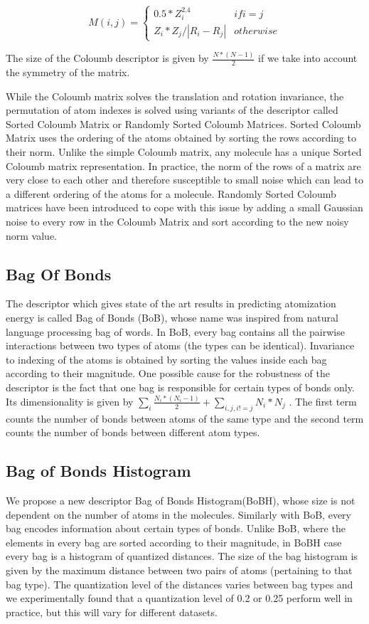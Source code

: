 \documentclass{article}
\begin{document}
\[M(i,j) = \left\{
  \begin{array}{lr}
    0.5*Z_i^{2.4} & if i = j\\
    Z_i * Z_j / |R_i - R_j| & otherwise
  \end{array}
\right.
\]

The size of the Coloumb descriptor is given by $\frac{N*(N - 1)}{2}$ if we take into account the symmetry of the matrix.

While the Coloumb matrix solves the translation and rotation invariance, the permutation of atom indexes is solved using variants of the descriptor called Sorted Coloumb Matrix or Randomly Sorted Coloumb Matrices.  Sorted Coloumb Matrix uses the ordering of the atoms obtained by sorting the rows according to their norm. Unlike the simple Coloumb matrix, any molecule has a unique Sorted Coloumb matrix representation.
In practice,  the norm of the rows of a matrix are very close to each other and therefore susceptible to small noise which can lead to a different ordering of the atoms for a molecule. Randomly Sorted Coloumb matrices have been introduced to cope with this issue by adding a small Gaussian noise to every row in the Coloumb Matrix and sort according to the new noisy norm value.

\subsection{Bag Of Bonds}
The descriptor which gives state of the art results in predicting atomization energy is called Bag of Bonds (BoB), whose name was inspired from natural language processing bag of words. In BoB, every bag contains all the pairwise interactions between two types of atoms (the types can be identical). Invariance to indexing of the atoms is obtained by sorting the values inside each bag according to their magnitude.
One possible cause for the robustness of the descriptor is the fact that one bag is responsible for certain types of bonds only.
Its dimensionality  is given by $\sum_i \frac{N_i*(N_i-1)}{2} + \sum_{i,j, i!=j} N_i*N_j	$ .
The first term counts the number of bonds between atoms of the same type and the second term counts the number of bonds between different atom types.

\subsection{Bag of Bonds Histogram}
We propose a new descriptor Bag of Bonds Histogram(BoBH), whose size is not dependent on the number of atoms in the molecules. Similarly with BoB, every bag  encodes information about certain types of bonds. Unlike BoB, where the elements in every bag are sorted according to their magnitude, in BoBH case every bag is a histogram of quantized distances. The size of the bag histogram is given by the maximum distance between two pairs of atoms (pertaining to that bag type). The quantization level of the distances varies between bag types and we experimentally found that a quantization level of 0.2 or 0.25 perform well in practice, but this will vary for different datasets.
\end{document}

